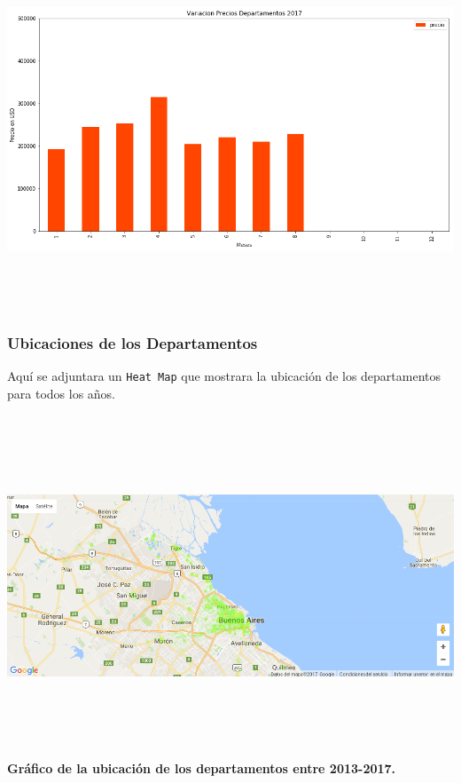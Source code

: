 \documentclass[a4paper, 10pt]{article}
\def\code#1{\texttt{#1}}
\newcommand\tab[1][0.5cm]{\hspace*{#1}}
\begin{document}
        \begin{center}
              \includegraphics[width=6in, height=4.2in]{images/vDeptos2017}
        \end{center}

      \subsubsection{Ubicaciones de los Departamentos}

        \tab Aquí se adjuntara un \code{Heat Map} que mostrara la ubicación de los departamentos para todos los años.

        \begin{center}
              \includegraphics[width=7in, height=4in]{images/ubicDeptos}
              \textbf{Gráfico de la ubicación de los departamentos entre 2013-2017.}
        \end{center}
\end{document}
